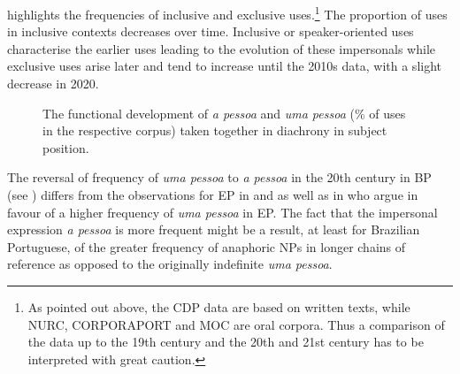 \documentclass[output=paper]{langscibook}
\begin{document}
 highlights the frequencies of inclusive and exclusive uses.{\footnote{As pointed out above, the CDP data are based on written texts, while NURC, CORPORAPORT and MOC are oral corpora. Thus a comparison of the data up to the 19th century and the 20th and 21st century has to be interpreted with great caution.}} The proportion of uses in inclusive contexts decreases over time. Inclusive or speaker-oriented uses characterise the earlier uses leading to the evolution of these impersonals while exclusive uses arise later and tend to increase until the 2010s data, with a slight decrease in 2020. 

\pgfplotsset{cycle list/PuOr-4}
\begin{figure}
    \caption{\label{fig:amaral:5}The functional development of \textit{a pessoa} and \textit{uma pessoa} (\% of uses in the respective corpus) taken together in diachrony in subject position.}
\end{figure}


The reversal of frequency of \textit{uma pessoa} to \textit{a pessoa} in the 20th century in BP (see ) differs from the observations for EP in \citet{Posio2021} and \citet{Martins2022} as well as in \citet[147]{Afonso2008} who argue in favour of a higher frequency of \textit{uma pessoa} in EP. The fact that the impersonal expression {\textit{a pessoa}} {is more frequent might be a result, at least for Brazilian Portuguese, of the greater frequency of anaphoric NPs in longer chains of reference as opposed to the originally indefinite} {\textit{uma pessoa}}. 
\end{document}

